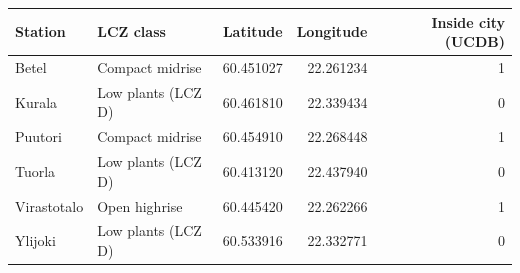 \begin{tabular}{llrrr}
\toprule
Station & LCZ class & Latitude & Longitude & Inside city (UCDB) \\
\midrule
Betel & Compact midrise & 60.451027 & 22.261234 & 1 \\
Kurala & Low plants (LCZ D) & 60.461810 & 22.339434 & 0 \\
Puutori & Compact midrise & 60.454910 & 22.268448 & 1 \\
Tuorla & Low plants (LCZ D) & 60.413120 & 22.437940 & 0 \\
Virastotalo & Open highrise & 60.445420 & 22.262266 & 1 \\
Ylijoki & Low plants (LCZ D) & 60.533916 & 22.332771 & 0 \\
\bottomrule
\end{tabular}
